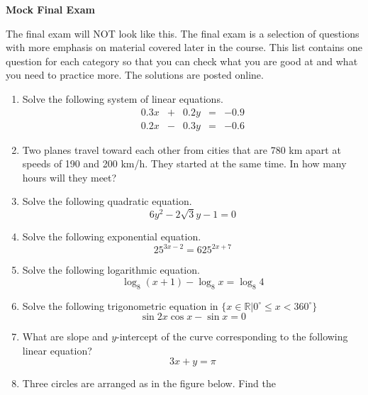 \documentclass[11pt]{article}
\begin{document}
\textbf{Mock Final Exam}

The final exam will NOT look like this. The final exam is a selection
of questions with more emphasis on material covered later in the
course. This list contains one question for each category so that you
can check what you are good at and what you need to practice more. The
solutions are posted online.

\begin{enumerate}
\item Solve the following system of linear equations.
  \begin{equation}
    \label{eq:oedeoyai}
    \begin{array}{lclcr}
      0.3x & + & 0.2y & = & -0.9 \\
      0.2x & - & 0.3y & = & -0.6
    \end{array}
  \end{equation}
\item Two planes travel toward each other from cities that are 780 km
  apart at speeds of 190 and 200 km/h. They started at the same time.
  In how many hours will they meet?
\item Solve the following quadratic equation.
  \begin{equation}
    \label{eq:eishahji}
    6y^{2}-2\sqrt{3}y-1=0
  \end{equation}
\item Solve the following exponential equation.
  \begin{equation}
    \label{eq:vohtovuj}
    25^{3x-2}=625^{2x+7}
  \end{equation}
\item Solve the following logarithmic equation.
  \begin{equation}
    \label{eq:laishedu}
    \log_{8}(x+1)-\log_{8}x=\log_{8}4
  \end{equation}
\item Solve the following trigonometric equation in $\{x\in\mathbb{R}|0^{\circ}\leq{}x<360^{\circ}\}$
  \begin{equation}
    \label{eq:iegheovi}
    \sin{}2x\cos{}x-\sin{}x=0    
  \end{equation}
\item What are slope and $y$-intercept of the curve corresponding to
  the following linear equation?
  \begin{equation}
    \label{eq:eopifeek}
    3x+y=\pi
  \end{equation}
  \newpage
\item Three circles are arranged as in the figure below. Find the

\end{enumerate}
\end{document}
